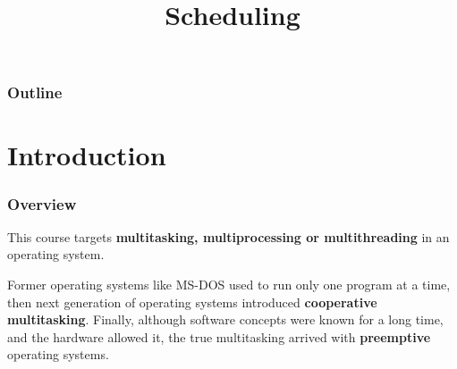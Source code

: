 %
%
%
%
%
%

%
%

%
%

\def\path{../../..}

%
%



%
%

\title{Scheduling}

%
%



%
%

\begin{frame}
  \titlepage
\end{frame}

%
%

\begin{frame}
  \frametitle{Outline}

  \tableofcontents
\end{frame}

%
%



%
%

%
%

\section{Introduction}


\begin{frame}
  \frametitle{Overview}

  This course targets \textbf{multitasking, multiprocessing or multithreading} in an operating system.

  \-

Former operating systems like MS-DOS used to run only one program at a time, then next generation of operating systems introduced \textbf{cooperative multitasking}. Finally, although software concepts were known for a long time, and the hardware allowed it, the true multitasking arrived with \textbf{preemptive} operating systems.    
 
\end{frame}

